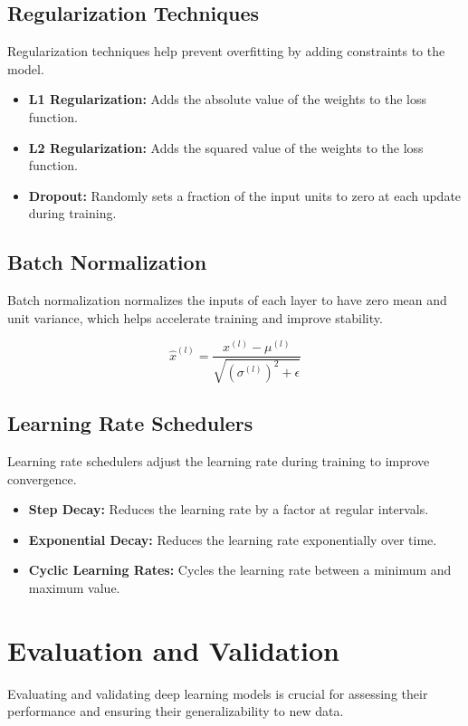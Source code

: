 \subsection{Regularization Techniques}
Regularization techniques help prevent overfitting by adding constraints to the model.

\begin{itemize}
    \item \textbf{L1 Regularization:} Adds the absolute value of the weights to the loss function.
    \item \textbf{L2 Regularization:} Adds the squared value of the weights to the loss function.
    \item \textbf{Dropout:} Randomly sets a fraction of the input units to zero at each update during training.
\end{itemize}

\subsection{Batch Normalization}
Batch normalization normalizes the inputs of each layer to have zero mean and unit variance, which helps accelerate training and improve stability.

\begin{equation}
\hat{x}^{(l)} = \frac{x^{(l)} - \mu^{(l)}}{\sqrt{(\sigma^{(l)})^2 + \epsilon}}
\end{equation}

\subsection{Learning Rate Schedulers}
Learning rate schedulers adjust the learning rate during training to improve convergence.

\begin{itemize}
    \item \textbf{Step Decay:} Reduces the learning rate by a factor at regular intervals.
    \item \textbf{Exponential Decay:} Reduces the learning rate exponentially over time.
    \item \textbf{Cyclic Learning Rates:} Cycles the learning rate between a minimum and maximum value.
\end{itemize}

\section{Evaluation and Validation}
Evaluating and validating deep learning models is crucial for assessing their performance and ensuring their generalizability to new data.

